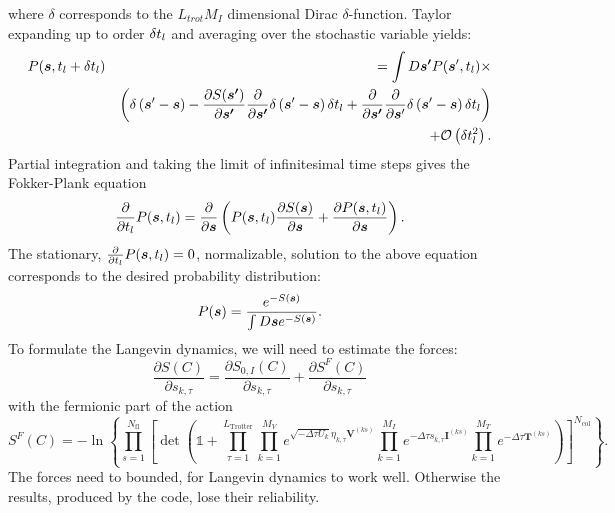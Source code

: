where $\delta$ corresponds to the $L_{trot} M_I $  dimensional Dirac $\delta$-function.   Taylor expanding  up to order $\delta t_{l}$  and averaging over the stochastic variable yields:
\begin{eqnarray}
P(\boldsymbol{s}, t_{l}  + \delta t_{l} ) & &     = \int D\boldsymbol{s'}  P  (\boldsymbol{s}', t_{l}  )   \times  \\  & &  \left(   \delta \left(  \boldsymbol{s}' - \boldsymbol{s}   \right)
- \frac{\partial S(\boldsymbol{s'}) }{\partial    \boldsymbol{s'} }   \frac{\partial  }{\partial    \boldsymbol{s'} } \delta \left(  \boldsymbol{s}' - \boldsymbol{s} \right)  \delta t_{l}   +
   \frac{\partial  }{\partial    \boldsymbol{s'} }   \frac{\partial  }{\partial    \boldsymbol{s}' }  \delta \left(  \boldsymbol{s}' - \boldsymbol{s}\right)    \delta t_{l}
\right)  \nonumber   \\
  &&   + {\cal O}  \left(  \delta t_{l}^2 \right) \nonumber.
\end{eqnarray}
Partial integration  and taking the limit of infinitesimal time steps   gives the Fokker-Plank equation
\begin{equation}
         \frac{\partial  }{\partial   t_{l}}  P( \boldsymbol{s}, t_{l})  =  \frac{\partial  }{\partial    \boldsymbol{s} }  \left( P( \boldsymbol{s}, t_{l})  \frac{\partial S(\boldsymbol{s}) }{\partial     \boldsymbol{s} }   +
          \frac{\partial P(\boldsymbol{s},t_{l}) }{\partial     \boldsymbol{s} }
         \right) .
\end{equation}
The stationary,  $ \frac{\partial  }{\partial   t_{l}}  P( \boldsymbol{s}, t_{l}) =0$,  normalizable,  solution to the above equation corresponds to the desired probability distribution:
\begin{equation}
          P(\boldsymbol{s}) =  \frac{ e^{ - S(\boldsymbol{s}) } }   {   \int D \boldsymbol{s}  e^{ - S(\boldsymbol{s}) } }.
\end{equation}
To formulate  the Langevin dynamics, we will need  to estimate the forces:
\begin{equation}
	\frac { \partial S(C)}{\partial s_{k,\tau} } =\frac { \partial S_{0,I}(C)}{\partial s_{k,\tau} } +  \frac { \partial S^F(C)}{\partial s_{k,\tau} }
\end{equation}
with the fermionic part of the action 
\begin{equation}
S^F(C) = - \ln{ \left\{
  \prod_{s=1}^{N_{\mathrm{fl}}}\left[\det\left(  \mathds{1} + 
     \prod_{\tau=1}^{L_{\mathrm{Trotter}}}   
 \prod_{k=1}^{M_V}   e^{  \sqrt{ -\Delta \tau  U_k} \eta_{k,\tau} {\bm V}^{(ks)} }   \prod_{k=1}^{M_I}   e^{  -\Delta \tau s_{k,\tau}  {\bm I}^{(ks)}}  
     \prod_{k=1}^{M_T}   e^{-\Delta \tau {\bm T}^{(ks)}} 
     \right) \right]^{N_{\mathrm{col}}} \right\}} .
\end{equation} 
The forces need to bounded, for Langevin dynamics to work well. Otherwise the results, produced by the code, lose their reliability. 

